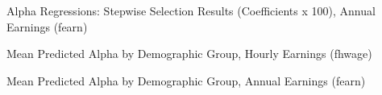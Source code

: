 \documentclass[12pt]{article}
\begin{document}
\begin{onehalfspace}
\begin{table}[H]
    \centering
    \caption{Alpha Regressions: Stepwise Selection Results (Coefficients x 100), Annual Earnings (fearn)}
    \label{tab:alpha_fearn_stepwise}
    \resizebox{\textwidth}{!}{%
        
    }
\end{table}










\begin{table}[H]
    \centering
    \caption{Mean Predicted Alpha by Demographic Group, Hourly Earnings (fhwage)}
    \label{tab:alpha_pred_means}
    \resizebox{0.9\textwidth}{!}{%
        
    }
\end{table}

\begin{table}[H]
    \centering
    \caption{Mean Predicted Alpha by Demographic Group, Annual Earnings (fearn)}
    \label{tab:alpha_fearn_pred_means}
    \resizebox{0.9\textwidth}{!}{%
        
    }
\end{table}



\end{onehalfspace}
\end{document}
